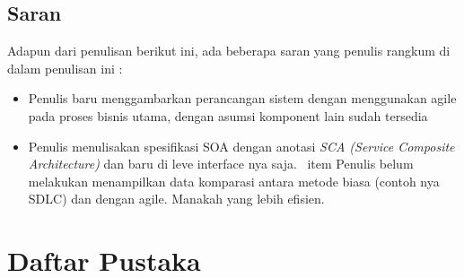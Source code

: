 \documentclass[9pt,twocolumn,twoside]{Gunadarma}
\begin{document}
\subsection{Saran}
Adapun dari penulisan berikut ini, ada beberapa saran yang penulis rangkum di dalam penulisan ini :
\begin{itemize}
\item Penulis baru menggambarkan perancangan sistem dengan menggunakan agile pada proses bisnis utama, dengan asumsi komponent lain sudah tersedia
\item Penulis menulisakan spesifikasi SOA dengan anotasi \textit{SCA (Service Composite Architecture)} dan baru di leve interface nya saja.
\ item Penulis belum melakukan menampilkan data komparasi antara metode biasa (contoh nya SDLC) dan dengan agile. Manakah yang lebih efisien. 
\end{itemize}

\section{Daftar Pustaka}






\end{document}
